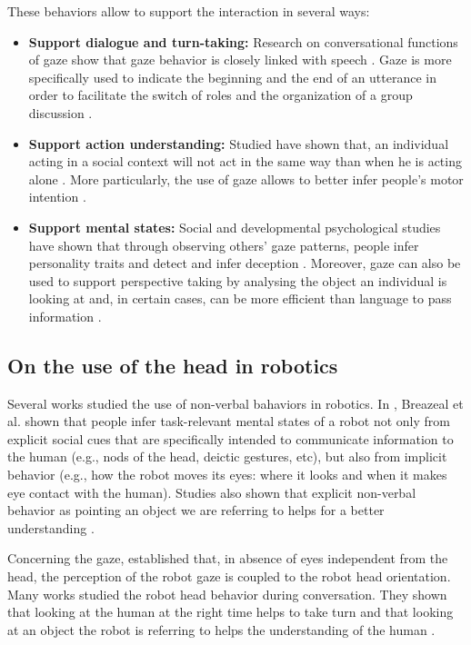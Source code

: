 \documentclass[english,a4paper,11pt,twoside]{StyleThese}
\begin{document}
These behaviors allow to support the interaction in several ways:
\begin{itemize}
\item \textbf{Support dialogue and turn-taking:} Research on conversational functions of gaze show that gaze behavior is closely linked with speech \cite{argyle1976gaze}. Gaze is more specifically used to indicate the beginning and the end of an utterance in order to facilitate the switch of roles \cite{kendon1967some} and the organization of a group discussion \cite{goffman1979footing}.
\item \textbf{Support action understanding:} Studied have shown that, an individual acting in a social context will not act in the same way than when he is acting alone \cite{becchio2010toward, vesper2010minimal}. More particularly, the use of gaze allows to better infer people's motor intention \cite{castiello2003understanding, pierno2006gaze}.
\item \textbf{Support mental states:} Social and developmental psychological studies have shown that through observing others’ gaze patterns, people infer personality traits \cite{kleinke1986gaze} and detect and infer deception \cite{hemsley1978effect}. Moreover, gaze can also be used to support perspective taking by analysing the object an individual is looking at \cite{furlanetto2013through} and, in certain cases, can be more efficient than language to pass information \cite{neider2010coordinating}.
\end{itemize}


\subsection{On the use of the head in robotics}

Several works studied the use of non-verbal bahaviors in robotics. In \cite{breazeal2005effects}, Breazeal et al. shown that people infer task-relevant mental states of a robot not only from explicit social cues that are specifically intended to communicate information to the human (e.g., nods of the head, deictic gestures, etc), but also from implicit behavior (e.g., how the robot moves its eyes: where it looks and when it makes eye contact with the human). Studies also shown that explicit non-verbal behavior as pointing an object we are referring to helps for a better understanding \cite{haring2012studies, salem2011friendly}.

Concerning the gaze, \cite{imai2002robot} established that, in absence of eyes independent from the head, the perception of the robot gaze is coupled to the robot head orientation. Many works studied the robot head behavior during conversation. They shown that looking at the human at the right time helps to take turn \cite{boucher2010facilitative, skantze2014turn} and that looking at an object the robot is referring to helps the understanding of the human \cite{mutlu2009footing, staudte2011investigating}.
\end{document}
